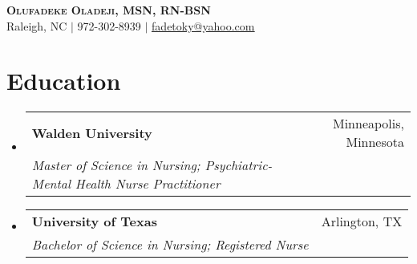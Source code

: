 \documentclass[letterpaper,11pt]{article}
\makeatletter
\newcommand{\resumeSubheading}[4]{
  \vspace{-2pt}\item
    \begin{tabular*}{0.97\textwidth}[t]{l@{\extracolsep{\fill}}r}
      \textbf{#1} & #2 \\
      \textit{\small#3} & \textit{\small #4} \\
    \end{tabular*}\vspace{-7pt}
}
\newcommand{\resumeSubHeadingListStart}{\begin{itemize}[leftmargin=0.15in, label={}]}
\newcommand{\resumeSubHeadingListEnd}{\end{itemize}}
\makeatother
\begin{document}

\begin{center}
    \textbf{\Huge \scshape Olufadeke Oladeji, MSN, RN-BSN} \\ \vspace{1pt}
    Raleigh, NC  $|$
    \small 972-302-8939 $|$
    \href{mailto:fadetoky@yahoo.com}{\underline{fadetoky@yahoo.com}}
\end{center}


\section{Education}
  \resumeSubHeadingListStart
    \resumeSubheading
      {Walden University}{Minneapolis, Minnesota}
      {Master of Science in Nursing; Psychiatric-Mental Health Nurse Practitioner}{}
    \resumeSubheading
      {University of Texas}{Arlington, TX}
      {Bachelor of Science in Nursing; Registered Nurse}{}
  \resumeSubHeadingListEnd


\end{document}

